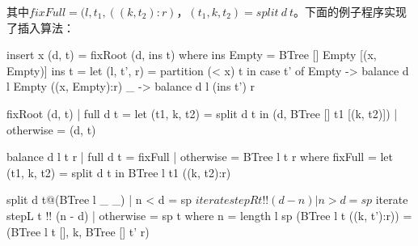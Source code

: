 \documentclass[b5paper]{ctexart}
\begin{document}
其中$fixFull = (l, t_1, ((k, t_2):r)$，$(t_1, k, t_2) = split\ d\ t$。下面的例子程序实现了插入算法：

\begin{Haskell}
insert x (d, t) = fixRoot (d, ins t) where
  ins Empty = BTree [] Empty [(x, Empty)]
  ins t = let (l, t', r) = partition (< x) t in
    case t' of
      Empty -> balance d l Empty ((x, Empty):r)
      _     -> balance d l (ins t') r

fixRoot (d, t) | full d t = let (t1, k, t2) = split d t in
                   (d, BTree [] t1 [(k, t2)])
               | otherwise = (d, t)

balance d l t r | full d t = fixFull
                | otherwise = BTree l t r
  where
    fixFull = let (t1, k, t2) = split d t in BTree l t1 ((k, t2):r)

split d t@(BTree l _ _) | n < d = sp $ iterate stepR t !! (d - n)
                        | n > d = sp $ iterate stepL t !! (n - d)
                        | otherwise = sp t
  where
    n = length l
    sp (BTree l t ((k, t'):r)) = (BTree l t [], k, BTree [] t' r)
\end{Haskell}

\begin{Exercise}\label{ex:btree-insert}
\label{ex:btree-leq}
\label{ex:btree-loop-insert}
\label{ex:btree-binary-search}
\end{Exercise}
\end{document}
